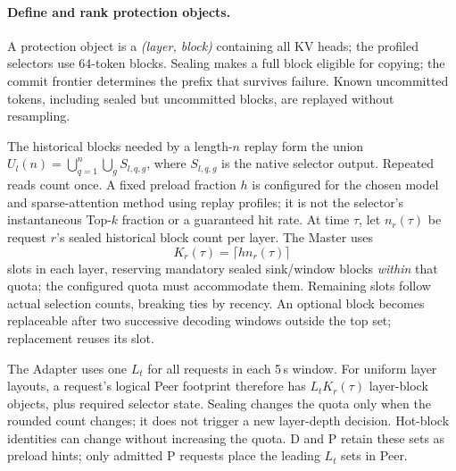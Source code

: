 \paragraph{Define and rank protection objects.}
A protection object is a \emph{(layer, block)} containing all KV heads;
the profiled selectors use 64-token blocks. Sealing makes a full block
eligible for copying; the commit frontier determines the prefix that
survives failure. Known uncommitted tokens, including sealed but
uncommitted blocks, are replayed without resampling.

The historical blocks needed by a length-$n$ replay form the union
$U_l(n)=\bigcup_{q=1}^{n}\bigcup_g S_{l,q,g}$, where $S_{l,q,g}$ is the
native selector output. Repeated reads count once. A fixed preload
fraction $h$ is configured for the chosen model and sparse-attention
method using replay profiles; it is not the selector's instantaneous
Top-$k$ fraction or a guaranteed hit rate. At time $\tau$, let $n_r(\tau)$
be request $r$'s sealed historical block count per layer. The Master uses
\begin{equation}
 K_r(\tau)=\lceil h n_r(\tau)\rceil
 \label{eq:hot-block-count}
\end{equation}
slots in each layer, reserving mandatory sealed sink/window blocks
\emph{within} that quota; the configured quota must accommodate them.
Remaining slots follow actual selection counts, breaking ties by recency.
An optional block becomes replaceable after two successive decoding
windows outside the top set; replacement reuses its slot.

The Adapter uses one $L_t$ for all requests in each 5\,s window. For
uniform layer layouts, a request's logical Peer footprint therefore has
$L_tK_r(\tau)$ layer-block objects, plus required selector state.
Sealing changes the quota only when the rounded count changes; it does
not trigger a new layer-depth decision. Hot-block identities can change
without increasing the quota. D and P retain these sets as preload hints;
only admitted P requests place the leading $L_t$ sets in Peer.

